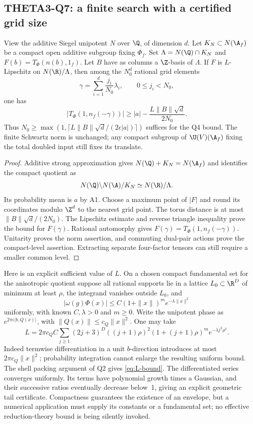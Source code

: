 \subsection{THETA3-Q7: a finite search with a certified grid size}\label{Q7}
View the additive Siegel unipotent $N$ over $\Q$, of dimension $d$. Let $K_N\subset N(\A_f)$ be a compact open additive subgroup fixing $\Phi_f$. Set
$\Lambda=N(\Q)\cap K_N$ and
$F(b)=T_\Phi(n(b),1_f)$. Let $B$ have as columns a $\Z$-basis of $\Lambda$. If $F$ is $L$-Lipschitz on $N(\R)/\Lambda$, then among the $N_0^d$ rational grid elements
\[
 \gamma=\sum_{i=1}^d\frac{j_i}{N_0}\lambda_i,
 \qquad 0\leq j_i<N_0,
\]
one has
\begin{equation}\label{eq:grid}
 |T_\Phi(1,n_f(-\gamma))|
 \geq |a|-\frac{L\|B\|\sqrt d}{2N_0}.
\end{equation}
Thus $N_0\geq\max(1,\lceil L\|B\|\sqrt d/(2\epsilon|a|)\rceil)$ suffices for the Q4 bound. The finite Schwartz norm is unchanged; any compact subgroup of $\U(V)(\A_f)$ fixing the total doubled input still fixes its translate.
\begin{proof}
Additive strong approximation gives $N(\Q)+K_N=N(\A_f)$ and identifies
the compact quotient as
\[
 N(\Q)\backslash N(\A)/K_N \simeq N(\R)/\Lambda.
\]
Its probability mean is $a$ by A1. Choose a maximum point of $|F|$ and round its coordinates modulo $\Z^d$ to the nearest grid point. The torus distance is at most $\|B\|\sqrt d/(2N_0)$. The Lipschitz estimate and reverse triangle inequality prove the bound for $F(\gamma)$. Rational automorphy gives $F(\gamma)=T_\Phi(1,n_f(-\gamma))$. Unitarity proves the norm assertion, and commuting dual-pair actions prove the compact-level assertion. Extracting separate four-factor tensors can still require a smaller common level.
\end{proof}
Here is an explicit sufficient value of $L$. On a chosen compact fundamental set for the anisotropic quotient suppose all rational supports lie in a lattice $L_0\subset\R^D$ of minimum at least $\rho$, the integrand vanishes outside $L_0$, and
\[
 |\omega(g)\Phi(x)|\leq C(1+\|x\|)^m e^{-\lambda\|x\|^2}
\]
uniformly, with known $C,\lambda>0$ and $m\geq0$. Write the unipotent phase as $e^{2\pi i\langle b,Q(x)\rangle}$, with
$\|Q(x)\|\leq c_Q\|x\|^2$. One may take
\begin{equation}\label{eq:L-bound}
 L=2\pi c_Q C\sum_{j\geq1}(2j+3)^D((j+1)\rho)^2
       (1+(j+1)\rho)^m e^{-\lambda j^2\rho^2}.
\end{equation}
Indeed termwise differentiation in a unit $b$-direction introduces at most $2\pi c_Q\|x\|^2$; probability integration cannot enlarge the resulting uniform bound. The shell packing argument of Q2 gives \eqref{eq:L-bound}. The differentiated series converges uniformly. Its terms have polynomial growth times a Gaussian, and their successive ratios eventually decrease below~1, giving an explicit geometric tail certificate. Compactness guarantees the existence of an envelope, but a numerical application must supply its constants or a fundamental set; no effective reduction-theory bound is being silently invoked.

